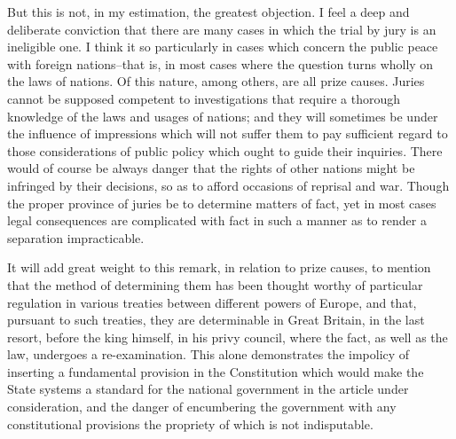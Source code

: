 But this is not, in my estimation, the greatest objection. I feel a deep and deliberate conviction that there are many cases in which the trial by jury is an ineligible one. I think it so particularly in cases which concern the public peace with foreign nations--that is, in most cases where the question turns wholly on the laws of nations. Of this nature, among others, are all prize causes. Juries cannot be supposed competent to investigations that require a thorough knowledge of the laws and usages of nations; and they will sometimes be under the influence of impressions which will not suffer them to pay sufficient regard to those considerations of public policy which ought to guide their inquiries. There would of course be always danger that the rights of other nations might be infringed by their decisions, so as to afford occasions of reprisal and war. Though the proper province of juries be to determine matters of fact, yet in most cases legal consequences are complicated with fact in such a manner as to render a separation impracticable.

It will add great weight to this remark, in relation to prize causes, to mention that the method of determining them has been thought worthy of particular regulation in various treaties between different powers of Europe, and that, pursuant to such treaties, they are determinable in Great Britain, in the last resort, before the king himself, in his privy council, where the fact, as well as the law, undergoes a re-examination. This alone demonstrates the impolicy of inserting a fundamental provision in the Constitution which would make the State systems a standard for the national government in the article under consideration, and the danger of encumbering the government with any constitutional provisions the propriety of which is not indisputable.

